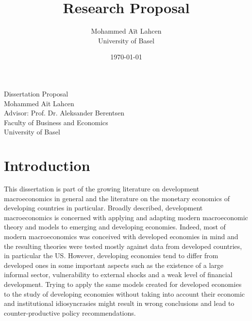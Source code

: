 \documentclass[12pt,a4paper,titlepage]{article}
\title{Research Proposal}
\author{Mohammed Aït Lahcen \\
University of Basel}
\date{\today}
\begin{document}


\begin{titlepage}


\begin{center}
\vspace*{10em}
\large \vspace{1em}
\huge Dissertation Proposal \\
\vspace{.5em}
\large Mohammed Aït Lahcen\\
\small Advisor: Prof. Dr. Aleksander Berentsen\\
\vspace{2em}
Faculty of Business and Economics\\
University of Basel\\
\vspace{4em}
\large

\end{center}


\end{titlepage}


\pagebreak



\pagebreak

\section{Introduction}

This dissertation is part of the growing literature on development macroeconomics in general and the literature on the monetary economics of developing countries in particular. Broadly described, development macroeconomics is concerned with applying and adapting modern macroeconomic theory and models to emerging and developing economies. Indeed, most of modern macroeconomics was conceived with developed economies in mind and the resulting theories were tested mostly against data from developed countries, in particular the US. However, developing economies tend to differ from developed ones in some important aspects such as the existence of a large informal sector, vulnerability to external shocks and a weak level of financial development. Trying to apply the same models created for developed economies to the study of developing economies without taking into account their economic and institutional idiosyncrasies might result in wrong conclusions and lead to counter-productive policy recommendations.
\end{document}
